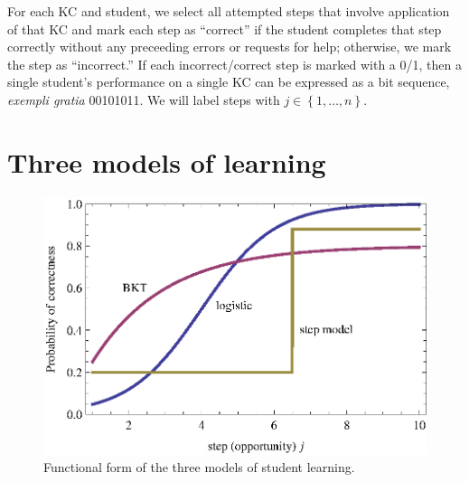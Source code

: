 \documentclass{acmlarge-edm}
\begin{document}
For each KC and student, we select all attempted steps that involve application
of that KC and mark each step as ``correct'' if
the student completes that step correctly without any preceeding errors or 
requests for help; otherwise, we mark the step as ``incorrect.''
\label{steps}  %
If each incorrect/correct step is marked with a 0/1, then
a single student's performance on a single KC can be expressed as a bit  sequence,
{\em exempli gratia} 00101011.  We will label
steps with $j\in\left\{1,\ldots,n\right\}$.  

\section{Three models of learning}

\begin{figure}
  \centering \includegraphics{three-models.eps}
  \caption{Functional form of the three models of student learning.}
    \label{three-models}
\end{figure}
\end{document}
